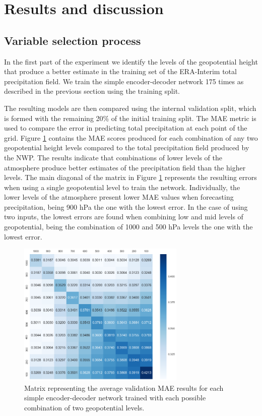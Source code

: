 \documentclass[twocol]{ametsoc}
\begin{document}
\section{Results and discussion}

\subsection{Variable selection process}

In the first part of the experiment we identify the levels of the geopotential height that produce a better estimate in the training set of the ERA-Interim total precipitation field. We train the simple encoder-decoder network 175 times as described in the previous section using the training split. 

The resulting models are then compared using the internal validation split, which is formed with the remaining 20\% of the initial training split. The MAE metric is used to compare the error in predicting total precipitation at each point of the grid. Figure \ref{heatmap} contains the MAE scores produced for each combination of any two geopotential height levels compared to the total precipitation field produced by the NWP. The results indicate that combinations of lower levels of the atmosphere produce better estimates of the precipitation field than the higher levels. The main diagonal of the matrix in Figure \ref{heatmap} represents the resulting errors when using a single geopotential level to train the network. Individually, the lower levels of the atmosphere present lower MAE values when forecasting precipitation, being 900 hPa the one with the lowest error. In the case of using two inputs, the lowest errors are found when combining low and mid levels of geopotential, being the combination of 1000 and 500 hPa levels the one with the lowest error.

\begin{figure}[h]
 \centerline{\includegraphics[width=8cm]{heatmap.png}}
  \caption{Matrix representing the average validation MAE results for each simple encoder-decoder network trained with each possible combination of two geopotential levels.}\label{heatmap}
\end{figure}
\end{document}
